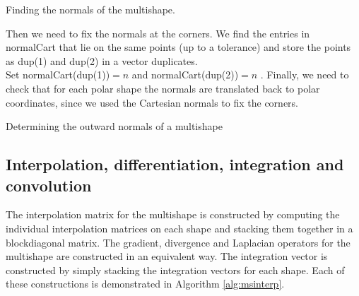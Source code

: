 \documentclass[11pt, a4paper]{article}
\theoremstyle{definition}
\begin{document}
\begin{algorithm}[H]
	\SetAlgoLined
	Finding the normals of the multishape.\\
	
	Then we need to fix the normals at the corners. We find the entries in normalCart that lie on the same points (up to a tolerance) and store the points as dup(1) and dup(2) in a vector duplicates. \\
	Set normalCart(dup(1))$ = n $ and normalCart(dup(2))$=n$ . Finally, we need to check that for each polar shape the normals are translated back to polar coordinates, since we used the Cartesian normals to fix the corners.\\
		
	\caption{Determining the outward normals of a multishape}
	\label{alg:msnormals}
\end{algorithm}


\subsection{Interpolation, differentiation, integration and convolution}
The interpolation matrix for the multishape is constructed by computing the individual interpolation matrices on each shape and stacking them together in a blockdiagonal matrix. The gradient, divergence and Laplacian operators for the multishape are constructed in an equivalent way. The integration vector is constructed by simply stacking the integration vectors for each shape. Each of these constructions is demonstrated in Algorithm \ref{alg:msinterp}.
\end{document}
